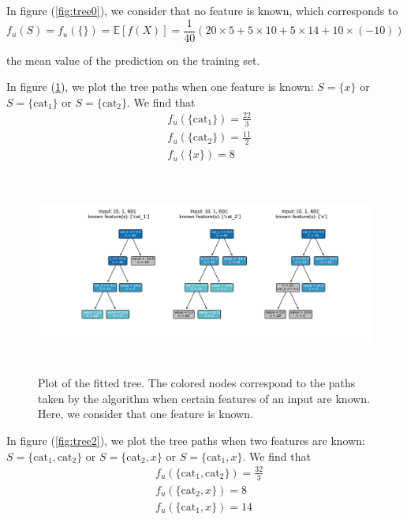 \documentclass[11pt]{article}
\begin{document}
In figure (\ref{fig:tree0}), we consider that no feature is known, which corresponds to 
$$f_u(S) = f_u(\{\}) = \mathbb{E}[f(X)] = \frac{1}{40}\left(20 \times 5 + 5 \times 10 + 5 \times 14 + 10 \times (-10)\right)$$

the mean value of the prediction on the training set.

In figure (\ref{fig:tree1}), we plot the tree paths when one feature is known: $S = \{x\}$ or $S = \{\text{cat}_1 \}$ or $S = \{\text{cat}_2 \}$.
We find that 
\begin{align*}
    & f_u(\{\text{cat}_1 \}) = \frac{22}{3}\\
    & f_u(\{\text{cat}_2 \}) = \frac{11}{2}\\
    & f_u(\{ x \}) = 8
\end{align*}

\begin{figure}[H]
    \centering
    \includegraphics[height=6.6cm]{"../outputs/plot_tree/figures/path_1_known.pdf"}
    \caption{Plot of the fitted tree. The colored nodes correspond to the paths taken 
    by the algorithm when certain features of an input are known. Here, we consider that 
    one feature is known.}
    \label{fig:tree1}
\end{figure}

In figure (\ref{fig:tree2}), we plot the tree paths when two features are known: $S = \{\text{cat}_1, \text{cat}_2\}$ or $S = \{\text{cat}_2, x \}$ or $S = \{\text{cat}_1, x \}$.
We find that 
\begin{align*}
    & f_u(\{\text{cat}_1, \text{cat}_2\}) = \frac{32}{3}\\
    & f_u(\{\text{cat}_2, x \}) = 8\\
    & f_u(\{\text{cat}_1, x\}) = 14
\end{align*}
\end{document}
